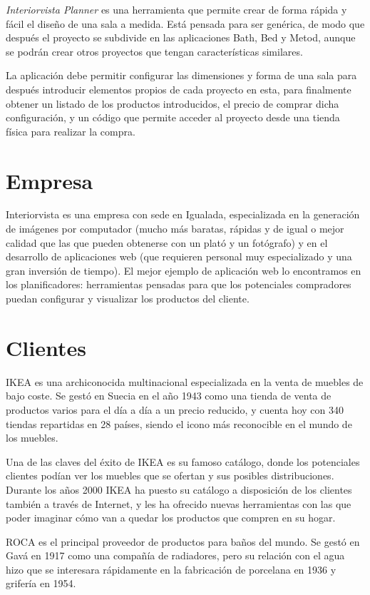 \textit{Interiorvista Planner} es una herramienta que permite crear de forma rápida y fácil el diseño de una sala a medida. Está pensada para ser genérica, de modo que después el proyecto se subdivide en las aplicaciones Bath, Bed y Metod, aunque se podrán crear otros proyectos que tengan características similares.

La aplicación debe permitir configurar las dimensiones y forma de una sala para después introducir elementos propios de cada proyecto en esta, para finalmente obtener un listado de los productos introducidos, el precio de comprar dicha configuración, y un código que permite acceder al proyecto desde una tienda física para realizar la compra.

\section{Empresa}
Interiorvista es una empresa con sede en Igualada, especializada en la generación de imágenes por computador (mucho más baratas, rápidas y de igual o mejor calidad que las que pueden obtenerse con un plató y un fotógrafo) y en el desarrollo de aplicaciones web (que requieren personal muy especializado y una gran inversión de tiempo). El mejor ejemplo de aplicación web lo encontramos en los planificadores: herramientas pensadas para que los potenciales compradores puedan configurar y visualizar los productos del cliente.

\section{Clientes}
IKEA es una archiconocida multinacional especializada en la venta de muebles de bajo coste. Se gestó en Suecia en el año 1943 como una tienda de venta de productos varios para el día a día a un precio reducido, y cuenta hoy con 340 tiendas repartidas en 28 países, siendo el icono más reconocible en el mundo de los muebles.

Una de las claves del éxito de IKEA es su famoso catálogo, donde los potenciales clientes podían ver los muebles que se ofertan y sus posibles distribuciones. Durante los años 2000 IKEA ha puesto su catálogo a disposición de los clientes también a través de Internet, y les ha ofrecido nuevas herramientas con las que poder imaginar cómo van a quedar los productos que compren en su hogar.

ROCA es el principal proveedor de productos para baños del mundo. Se gestó en Gavá en 1917 como una compañía de radiadores, pero su relación con el agua hizo que se interesara rápidamente en la fabricación de porcelana en 1936 y grifería en 1954.

